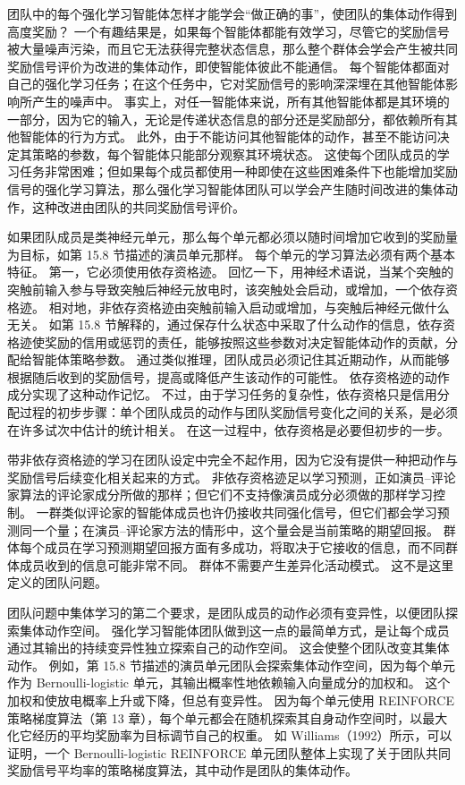 \documentclass[UTF8, 12pt, fontset=fandol, oneside]{ctexart}
\begin{document}
团队中的每个强化学习智能体怎样才能学会“做正确的事”，使团队的集体动作得到高度奖励？
一个有趣结果是，如果每个智能体都能有效学习，尽管它的奖励信号被大量噪声污染，而且它无法获得完整状态信息，那么整个群体会学会产生被共同奖励信号评价为改进的集体动作，即使智能体彼此不能通信。
每个智能体都面对自己的强化学习任务；在这个任务中，它对奖励信号的影响深深埋在其他智能体影响所产生的噪声中。
事实上，对任一智能体来说，所有其他智能体都是其环境的一部分，因为它的输入，无论是传递状态信息的部分还是奖励部分，都依赖所有其他智能体的行为方式。
此外，由于不能访问其他智能体的动作，甚至不能访问决定其策略的参数，每个智能体只能部分观察其环境状态。
这使每个团队成员的学习任务非常困难；但如果每个成员都使用一种即使在这些困难条件下也能增加奖励信号的强化学习算法，那么强化学习智能体团队可以学会产生随时间改进的集体动作，这种改进由团队的共同奖励信号评价。

如果团队成员是类神经元单元，那么每个单元都必须以随时间增加它收到的奖励量为目标，如第 15.8 节描述的演员单元那样。
每个单元的学习算法必须有两个基本特征。
第一，它必须使用依存资格迹。
回忆一下，用神经术语说，当某个突触的突触前输入参与导致突触后神经元放电时，该突触处会启动，或增加，一个依存资格迹。
相对地，非依存资格迹由突触前输入启动或增加，与突触后神经元做什么无关。
如第 15.8 节解释的，通过保存什么状态中采取了什么动作的信息，依存资格迹使奖励的信用或惩罚的责任，能够按照这些参数对决定智能体动作的贡献，分配给智能体策略参数。
通过类似推理，团队成员必须记住其近期动作，从而能够根据随后收到的奖励信号，提高或降低产生该动作的可能性。
依存资格迹的动作成分实现了这种动作记忆。
不过，由于学习任务的复杂性，依存资格只是信用分配过程的初步步骤：单个团队成员的动作与团队奖励信号变化之间的关系，是必须在许多试次中估计的统计相关。
在这一过程中，依存资格是必要但初步的一步。

带非依存资格迹的学习在团队设定中完全不起作用，因为它没有提供一种把动作与奖励信号后续变化相关起来的方式。
非依存资格迹足以学习预测，正如演员--评论家算法的评论家成分所做的那样；但它们不支持像演员成分必须做的那样学习控制。
一群类似评论家的智能体成员也许仍接收共同强化信号，但它们都会学习预测同一个量；在演员--评论家方法的情形中，这个量会是当前策略的期望回报。
群体每个成员在学习预测期望回报方面有多成功，将取决于它接收的信息，而不同群体成员收到的信息可能非常不同。
群体不需要产生差异化活动模式。
这不是这里定义的团队问题。

团队问题中集体学习的第二个要求，是团队成员的动作必须有变异性，以便团队探索集体动作空间。
强化学习智能体团队做到这一点的最简单方式，是让每个成员通过其输出的持续变异性独立探索自己的动作空间。
这会使整个团队改变其集体动作。
例如，第 15.8 节描述的演员单元团队会探索集体动作空间，因为每个单元作为 Bernoulli-logistic 单元，其输出概率性地依赖输入向量成分的加权和。
这个加权和使放电概率上升或下降，但总有变异性。
因为每个单元使用 REINFORCE 策略梯度算法（第 13 章），每个单元都会在随机探索其自身动作空间时，以最大化它经历的平均奖励率为目标调节自己的权重。
如 Williams（1992）所示，可以证明，一个 Bernoulli-logistic REINFORCE 单元团队整体上实现了关于团队共同奖励信号平均率的策略梯度算法，其中动作是团队的集体动作。
\end{document}

